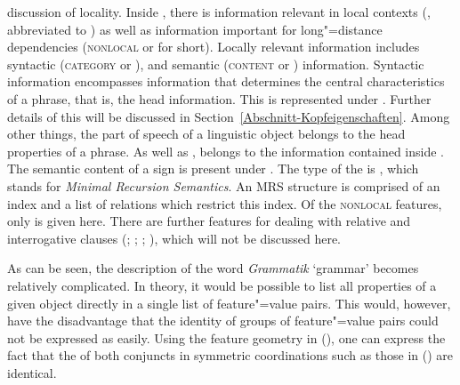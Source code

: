 discussion of locality. Inside \synsem, there is information relevant in local contexts (\local,
abbreviated to \loc) as well as information important for long"=distance dependencies
(\textsc{nonlocal} or \nonloc for short). Locally relevant information includes syntactic
(\textsc{category} or \cat), and semantic (\textsc{content} or \cont) information. Syntactic
information encompasses information that determines the central characteristics of a phrase, that
is, the head information. This is represented under \head. Further details of this will be discussed in
 Section~\ref{Abschnitt-Kopfeigenschaften}. Among other things, the part of speech of a 
 linguistic object belongs to the head properties of a phrase. As well as \head, \subcat belongs to the information contained inside \cat. The semantic content
 of a sign is present under \cont. The type of the \contv is , which stands for \emph{Minimal Recursion
Semantics}\indexmrs \citep*{CFPS2005a}. An MRS structure is comprised of an index and a list of
relations which restrict this index. Of the \textsc{nonlocal} features, only \slasch is given here. There are further features for dealing with relative
and interrogative clauses (\citealp{ps2}; \citealp{Sag97a};
\citealp{GSag2000a-u}; \citealp{Holler2005a-u}), which will not be discussed here.

As can be seen, the description of the word \emph{Grammatik} `grammar' becomes relatively complicated. In theory, it would be possible to list all properties
of a given object directly in a single list of feature"=value pairs. This would, however, have the disadvantage that the identity of groups of feature"=value pairs could not be
expressed as easily. Using the feature geometry in (), one can express the fact that the \catvs of both conjuncts in symmetric coordinations
such as those in () are identical.\label{Seite-HPSG-Koordination}

